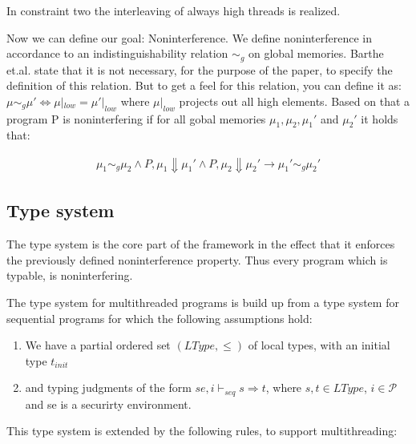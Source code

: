 \documentclass[a4paper,10pt]{llncs}
\theoremstyle{definition}
\begin{document}
In constraint two the interleaving of always high threads is realized.


Now we can define our goal: Noninterference. We define noninterference
in accordance to an indistinguishability relation $\sim_g$ on global memories.
Barthe et.al. state that it is not necessary, for the purpose of the paper,
to specify the definition of this relation. But to get a feel for this
relation, you can define it as: $\mu \sim_g \mu' \Leftrightarrow \mu|_{low} =
\mu'|_{low}$ where $\mu|_{low}$ projects out all high elements. Based on that
a program P is noninterfering if for all gobal memories $\mu_1, \mu_2, \mu_1'$
and $\mu_2'$ it holds that:

\begin{align*}
\mu_1 \sim_g \mu_2 \land P,\mu_1 \Downarrow \mu_1' \land P,\mu_2 \Downarrow \mu_2' \rightarrow \mu_1' \sim_g \mu_2'
\end{align*}

\subsection{Type system}
\label{sec:typesystem}
The type system is the core part of the framework in the effect that it
enforces the previously defined noninterference property. Thus every
program which is typable, is noninterfering.

The type system for multithreaded programs is build up from a type system
for sequential programs for which the following assumptions hold:

\begin{enumerate}
\item We have a partial ordered set $(LType, \leq)$ of local types, with an initial
      type $t_{init}$
\item and typing judgments of the form $se, i \vdash_{seq} s \Rightarrow t$, where
      $s, t \in LType$, $i \in \mathcal{P}$ and se is a securirty environment.
\end{enumerate}

This type system is extended by the following rules, to support multithreading:

\begin{prooftree}
\end{prooftree}
\end{document}
